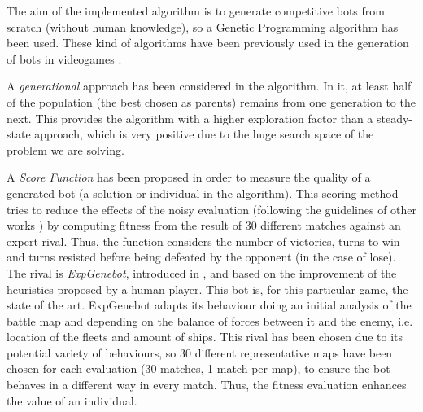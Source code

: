 \documentclass[runningheads,a4paper]{llncs}
\begin{document}

The aim of the implemented algorithm is to generate competitive bots from scratch (without human knowledge), so a Genetic Programming algorithm has been used. These kind of algorithms have been previously used in the generation of bots in videogames \cite{Esparcia2013GPunreal,Harper2014403}. 

A \textit{generational} approach has been considered in the algorithm. 
In it, at least half of the population (the best chosen as parents) remains from one generation to the next. This provides the algorithm with a higher exploration factor than a steady-state approach, which is very positive due to the huge search space of the problem we are solving.


A \textit{Score Function} has been proposed in order to measure the quality of a generated bot (a solution or individual in the algorithm). This scoring method tries to reduce the effects of the noisy evaluation (following the guidelines of other works \cite{DBLP:journals/jcst/MoraFGGF12}) by computing fitness from the result of 30 different matches against an expert rival.
Thus, the function considers the number of victories, turns to win and turns resisted before being defeated by the opponent (in the case of lose). The rival is \textit{ExpGenebot}, introduced in
\cite{DBLP:conf/cig/Fernandez-AresGMG12}, and based on the improvement of the heuristics proposed by a human player. This bot is, for this particular game, the state of the art. ExpGenebot adapts its behaviour doing an initial analysis
of the battle map and depending on the balance of forces between it and the enemy, i.e. location of the fleets and amount of ships.
This rival has been chosen due to its potential variety of behaviours,
so 30 different representative maps have been chosen for each
evaluation (30 matches, 1 match per map), to ensure the bot behaves in a different way in every match. Thus, the fitness evaluation enhances the value of an individual. 
\end{document}
